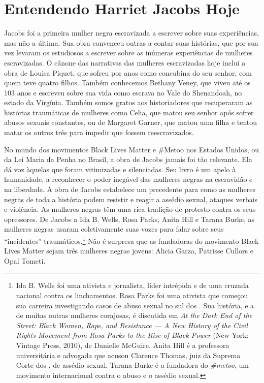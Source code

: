 \section{Entendendo Harriet Jacobs Hoje}

Jacobs foi a primeira mulher negra escravizada a escrever sobre suas
experiências, mas não a última. Sua obra convenceu outras a contar suas
histórias, que por sua vez levaram os estudiosos a escrever sobre as
inúmeras experiências de mulheres escravizadas. O cânone das narrativas
das mulheres escravizadas hoje inclui a obra de Louisa Piquet, que
sofreu por anos como concubina do seu senhor, com quem teve quatro
filhos. Também conhecemos Bethany Veney, que viveu até os 103 anos e
escreveu sobre sua vida como escrava no Vale do Shenandoah, no estado da
Virgínia. Também somos gratos aos historiadores que recuperaram as
histórias traumáticas de mulheres como Celia, que matou seu senhor após
sofrer abusos sexuais constantes, ou de Margaret Garner, que matou uma
filha e tentou matar os outros três para impedir que fossem
reescravizados.

No mundo dos movimentos Black Lives Matter e \#Metoo nos Estados Unidos,
ou da Lei Maria da Penha no Brasil, a obra de Jacobs jamais foi tão
relevante. Ela dá voz àquelas que foram vitimizadas e silenciadas. Seu
livro é um apelo à humanidade, a reconhecer o poder inegável das
mulheres negras na escravidão e na liberdade. A obra de Jacobs
estabelece um precedente para como as mulheres negras de toda a história
podem resistir e reagir a assédio sexual, ataques verbais e violência.
As mulheres negras têm uma rica tradição de protesto contra os seus
opressores. De Jacobs a Ida B. Wells, Rosa Parks, Anita Hill e Tarana
Burke, as mulheres negras usaram coletivamente suas vozes para falar
sobre seus ``incidentes'' traumáticos.\footnote{Ida B. Wells foi uma
  ativista e jornalista, líder intrépida e de uma cruzada nacional
  contra os linchamentos. Rosa Parks foi uma ativista que começou sua
  carreira investigando casos de abuso sexual no sul dos . Sua
  história, e a de muitas outras mulheres corajosas, é discutida em
  \emph{At the Dark End of the Street: Black Women, Rape, and
  Resistance --- A New History of the Civil Rights Movement from Rosa
  Parks to the Rise of Black Power} (New York: Vintage Press, 2010), de
  Danielle McGuire. Anita Hill é a professora universitária e advogada
  que acusou Clarence Thomas, juiz da Suprema Corte dos , de assédio
  sexual. Tarana Burke é a fundadora do \emph{\#metoo}, um movimento
  internacional contra o abuso e o assédio sexual.} Não é surpresa que
as fundadoras do movimento Black Lives Matter sejam três mulheres negras
jovens: Alicia Garza, Patrisse Cullors e Opal Tometi.

